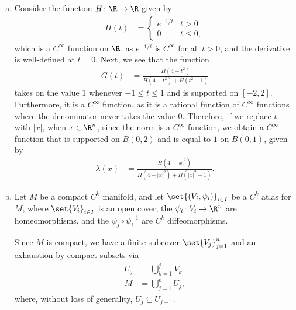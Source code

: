 \documentclass[10pt]{mypackage}
\begin{document}
\begin{solution}\hfill
  \begin{enumerate}[(a)]
    \item Consider the function $H\colon \R\rightarrow \R$ given by
      \begin{align*}
        H(t) &= \begin{cases}
          e^{-1/t} & t > 0\\
          0 & t\leq 0,
        \end{cases}
      \end{align*}
      which is a $C^{\infty}$ function on $\R$, as $e^{-1/t}$ is $C^{\infty}$ for all $t > 0$, and the derivative is well-defined at $t = 0$. Next, we see that the function
      \begin{align*}
        G(t) &= \frac{H\left( 4-t^2 \right)}{H\left( 4-t^2 \right) + H\left( t^2 - 1 \right)}
      \end{align*}
      takes on the value $1$ whenever $-1\leq t \leq 1$ and is supported on $[-2,2]$. Furthermore, it is a $C^{\infty}$ function, as it is a rational function of $C^{\infty}$ functions where the denominator never takes the value $0$. Therefore, if we replace $t$ with $\left\vert x \right\vert$, when $x \in \R^{n}$, since the norm is a $C^{\infty}$ function, we obtain a $C^{\infty}$ function that is supported on $B\left( 0,2 \right)$ and is equal to $1$ on $B\left( 0,1 \right)$, given by
      \begin{align*}
        \lambda\left( x \right) &= \frac{H\left( 4-\left\vert x \right\vert^2 \right)}{H\left( 4-\left\vert x \right\vert^2 \right) + H\left( \left\vert x \right\vert^2 - 1 \right)}.
      \end{align*}
    \item Let $M$ be a compact $C^{k}$ manifold, and let $\set{\left( V_i,\psi_i \right)}_{i\in I}$ be a $C^{k}$ atlas for $M$, where  $\set{V_i}_{i\in I}$ is an open cover, the $\psi_i\colon V_i\rightarrow \R^{n}$ are homeomorphisms, and the $\psi_{j}\circ \psi_{i}^{-1}$ are $C^{k}$ diffeomorphisms.\newline

      Since $M$ is compact, we have a finite subcover $\set{V_j}_{j=1}^{n}$ and an exhaustion by compact subsets via
      \begin{align*}
        U_{j} &= \bigcup_{k=1}^{j} V_k\\
        M &= \bigcup_{j=1}^{n}U_j,
      \end{align*}
      where, without loss of generality, $ \overline{U_{j}} \subsetneq U_{j+1}$.\newline


\end{enumerate}
\end{solution}
\end{document}
